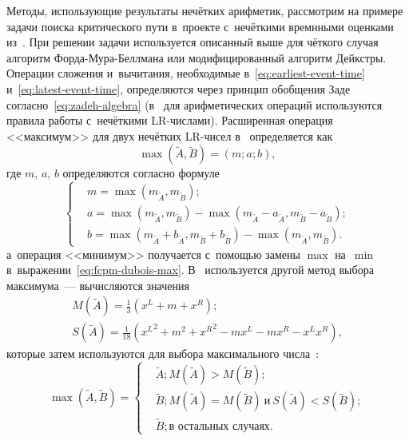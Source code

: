 Методы, использующие результаты нечётких арифметик, рассмотрим на примере задачи поиска критического пути в~проекте с~нечёткими времнными оценками из~\cite{Dubois_Prade}. При решении задачи используется описанный выше для чёткого случая алгоритм Форда-Мура-Беллмана или модифицированный алгоритм Дейкстры. Операции сложения и~вычитания, необходимые в~\eqref{eq:earliest-event-time} и~\eqref{eq:latest-event-time}, определяются через принцип обобщения Заде согласно~\eqref{eq:zadeh-algebra} (в~\cite{Iran_Railways, Uskov_FCPM, Leondes} для арифметических операций используются правила работы с~нечёткими LR-числами). Расширенная операция <<максимум>> для двух нечётких LR-чисел в~\cite{Dubois_Prade, Uskov_FCPM, Pavlov_Sokolov} определяется как
\begin{equation*}
  \max \left(\tilde A, \tilde B \right) = \left(m; a; b \right),
\end{equation*}
где $m$, $a$, $b$ определяются согласно формуле
\begin{equation}
  \label{eq:fcpm-dubois-max}
  \left \{ \begin{aligned}
    & m = \max \left( m_{\tilde A}, m_{\tilde B} \right); \\
    & a = \max \left( m_{\tilde A}, m_{\tilde B} \right) - \max \left( m_{\tilde A} - a_{\tilde A}, m_{\tilde B} - a_{\tilde B} \right); \\
    & b = \max \left( m_{\tilde A} + b_{\tilde A}, m_{\tilde B} + b_{\tilde B} \right) - \max \left( m_{\tilde A}, m_{\tilde B} \right).
  \end{aligned} \right.
\end{equation}
а~операция <<минимум>> получается с~помощью замены $\max$ на~$\min$ в~выражении~\eqref{eq:fcpm-dubois-max}. В~\cite{Leondes} используется другой метод выбора максимума~--- вычисляются значения
\begin{gather*}
  M\left(\tilde A \right) = \frac{1}{3}\left(x^L+m+x^R\right); \\
  S\left(\tilde A \right) = \frac{1}{18}\left( {x^L}^2+m^2+{x^R}^2 - mx^L - mx^R -x^L x^R \right),
\end{gather*}
которые затем используются для выбора максимального числа~\cite{McCahon_Lee}:
\begin{equation}
\label{eq:mccaloh-lee-comparison}
  \max \left(\tilde A, \tilde B \right) =
  \left\{ \begin{aligned}
    & \tilde A; M\left(\tilde A \right) > M\left(\tilde B \right); \\
    & \tilde B; M\left(\tilde A \right) = M\left(\tilde B \right)\ \text{и}\ S\left(\tilde A \right) < S\left(\tilde B \right); \\
    & \tilde B; \text{в остальных случаях}.
  \end{aligned}\right.
\end{equation}

